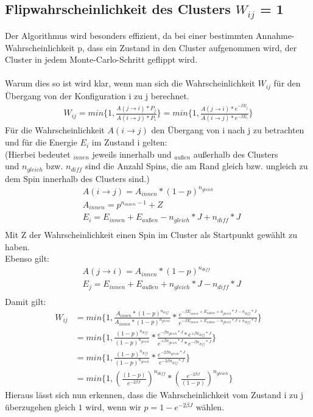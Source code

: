 \subsection{Flipwahrscheinlichkeit des Clusters  $W_{ij}$ = 1}
Der Algorithmus wird besonders effizient, da bei einer bestimmten Annahme-Wahrscheinlichkeit p, dass ein Zustand in den Cluster aufgenommen wird, der Cluster in jedem Monte-Carlo-Schritt geflippt wird.\\\\
Warum dies so ist wird klar, wenn man sich die Wahrscheinlichkeit $W_{ij}$ für den Übergang von der Konfiguration i zu j berechnet.
\begin{align}
W_{ij} = min\{1, \frac{A(j \rightarrow i) * P_j}{A(i \rightarrow j) * P_i} \} = min\{1, \frac{A(j \rightarrow i) * e^{-\beta E_j}}{A(i \rightarrow j) * e^{-\beta E_i}} \}
\end{align}
Für die Wahrscheinlichkeit $A(i \rightarrow j)$ den Übergang von i nach j zu betrachten und für die Energie $E_i$ im Zustand i gelten:\\
(Hierbei bedeutet $_{innen}$ jeweils innerhalb und $_{außen}$ außerhalb des Clusters\\
und $n_{gleich}$ bzw. $n_{diff}$ sind die Anzahl Spins, die am Rand gleich bzw. ungleich zu dem Spin innerhalb des Clusters sind.)
\begin{align}
&A(i \rightarrow j)=A_{innen} * (1 - p)^{n_{gleich}}\\
&A_{innen} = p^{n_{innen}-1} + Z\\
&E_i = E_{innen} + E_{außen} - n_{gleich} * J + n_{diff} * J\\
\end{align}
Mit Z der Wahrscheinlichkeit einen Spin im Cluster als Startpunkt gewählt zu haben.\\
Ebenso gilt:
\begin{align}
&A(j \rightarrow i)=A_{innen} * (1 - p)^{n_{diff}}\\
&E_j = E_{innen} + E_{außen} + n_{gleich} * J - n_{diff} * J\\
\end{align}
Damit gilt:
\begin{align}
W_{ij} &= min\{1, \frac{A_{innen}*(1-p)^{n_{diff}}}{A_{innen}*(1-p)^{n_{gleich}}} * \frac{e^{-\beta E_{innen} + E_{außen} + n_{gleich} * J - n_{diff} * J}}{e^{-\beta E_{innen} + E_{außen} - n_{gleich} * J + n_{diff} * J}}\} \\
&= min\{1, \frac{(1-p)^{n_{diff}}}{(1-p)^{n_{gleich}}} * \frac{e^{-\beta n_{gleich} * J} * e^{+\beta n_{diff} * J}}{e^{+\beta n_{gleich} * J} * e^{-\beta n_{diff} * J}}\}\\
&= min\{1, \frac{(1-p)^{n_{diff}}}{(1-p)^{n_{gleich}}} * \frac{e^{-2\beta n_{gleich} * J}}{e^{-2\beta n_{diff} * J}}\}\\
&= min\{1, \left(\frac{(1-p)}{e^{-2\beta J}}\right)^{n_{diff}} * \left(\frac{e^{-2\beta J}}{(1-p)}\right)^{n_{gleich}}\}
\end{align}
Hieraus lässt sich nun erkennen, dass die Wahrscheinlichkeit vom Zustand i zu j überzugehen gleich $1$ wird, wenn wir $p = 1 - e^{-2\beta J}$ wählen.

